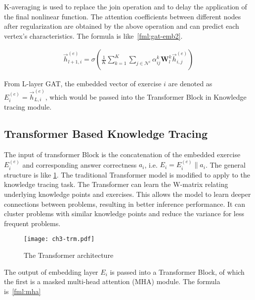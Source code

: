 K-averaging is used to replace the join operation and to delay the application of the final nonlinear function. The attention coefficients between different nodes after regularization are obtained by the above operation and can predict each vertex's characteristics. The formula is like~\ref{fml:gat-emb2}.

\begin{align}
    \overrightarrow{h}^{(e)}_{l+1,i}=\sigma(\frac{1}{K} \sum_{k=1}^{K} \sum_{j \in \mathcal{N}^i} \alpha_{i j}^{k} \mathbf{W}_l^{k} \overrightarrow{h}^{(e)}_{i,j})\label{fml:gat-emb3}
\end{align}

From L-layer GAT, the embedded vector of exercise \(i\) are denoted as \(E^{(e)}_i = \overrightarrow{h}^{(e)}_{L, i}\), which would be passed into the Transformer Block in Knowledge tracing module.

\subsection{Transformer Based Knowledge Tracing}
The input of transformer Block is the concatenation of the embedded exercise \(E^{(e)}_i \) and corresponding answer correctness \(a_i\), i.e. \(E_i=E^{(e)}_i\|a_i\). The general structure is like \figurename{\ref{fig:ch3-fig5}}. The traditional Transformer model is modified to apply to the knowledge tracing task. The Transformer can learn the W-matrix relating underlying knowledge points and exercises. This allows the model to learn deeper connections between problems, resulting in better inference performance. It can cluster problems with similar knowledge points and reduce the variance for less frequent problems.
\begin{figure}[htbp!]
    \centering
    \texttt{[image: ch3-trm.pdf]}
    \caption{The Transformer architecture}
    \label{fig:ch3-fig5}
\end{figure}

The output of embedding layer \(E_i\) is passed into a Transformer Block, of which the first is a masked multi-head attention (MHA) module. The formula is~\ref{fml:mha}


